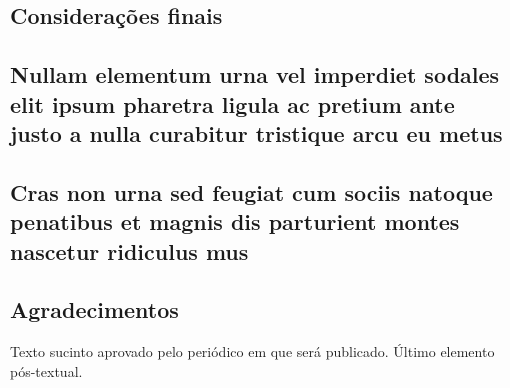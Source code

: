 \documentclass[
article,			%
11pt,				%
oneside,			%
a4paper,			%
english,			%
brazil,				%
sumario=tradicional
]{abntex2}
\begin{document}
	
	\section{Considerações finais}
	
	\lipsum[1]
	
	\begin{citacao}
		\lipsum[2]
	\end{citacao}
	
	\lipsum[3]
	
	\postextual
	
	
	
	
	
	\begin{apendicesenv}
		
		\chapter{Nullam elementum urna vel imperdiet sodales elit ipsum pharetra ligula
			ac pretium ante justo a nulla curabitur tristique arcu eu metus}
		\lipsum[55-56]
		
	\end{apendicesenv}
	
	\begin{anexosenv}
		
		\chapter{Cras non urna sed feugiat cum sociis natoque penatibus et magnis dis
			parturient montes nascetur ridiculus mus}
		
		\lipsum[31]
		
	\end{anexosenv}
	
	
	\section*{Agradecimentos}
	Texto sucinto aprovado pelo periódico em que será publicado. Último 
	elemento pós-textual.
	
\end{document}
